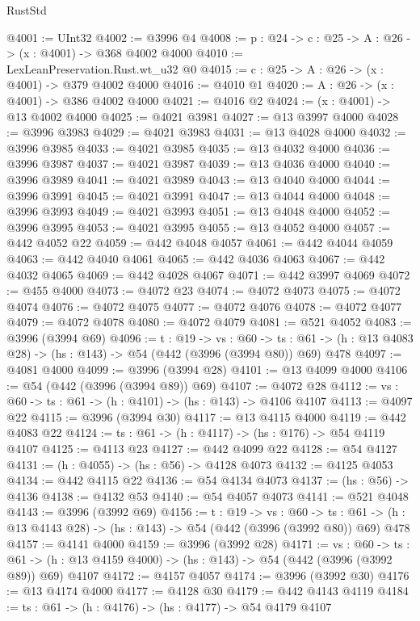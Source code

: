 \begin{lexlean}{RustStd}
\begin{coremodule}
@4001 := UInt32
@4002 := @3996 @4
@4008 := {p : @24} -> {c : @25} -> {A : @26} -> (x : @4001) -> @368 @4002 @4000
@4010 := LexLeanPreservation.Rust.wt_u32 @0
@4015 := {c : @25} -> {A : @26} -> (x : @4001) -> @379 @4002 @4000
@4016 := @4010 @1
@4020 := {A : @26} -> (x : @4001) -> @386 @4002 @4000
@4021 := @4016 @2
@4024 := (x : @4001) -> @13 @4002 @4000
@4025 := @4021 @3981
@4027 := @13 @3997 @4000
@4028 := @3996 @3983
@4029 := @4021 @3983
@4031 := @13 @4028 @4000
@4032 := @3996 @3985
@4033 := @4021 @3985
@4035 := @13 @4032 @4000
@4036 := @3996 @3987
@4037 := @4021 @3987
@4039 := @13 @4036 @4000
@4040 := @3996 @3989
@4041 := @4021 @3989
@4043 := @13 @4040 @4000
@4044 := @3996 @3991
@4045 := @4021 @3991
@4047 := @13 @4044 @4000
@4048 := @3996 @3993
@4049 := @4021 @3993
@4051 := @13 @4048 @4000
@4052 := @3996 @3995
@4053 := @4021 @3995
@4055 := @13 @4052 @4000
@4057 := @442 @4052 @22
@4059 := @442 @4048 @4057
@4061 := @442 @4044 @4059
@4063 := @442 @4040 @4061
@4065 := @442 @4036 @4063
@4067 := @442 @4032 @4065
@4069 := @442 @4028 @4067
@4071 := @442 @3997 @4069
@4072 := @455 @4000
@4073 := @4072 @23
@4074 := @4072 @4073
@4075 := @4072 @4074
@4076 := @4072 @4075
@4077 := @4072 @4076
@4078 := @4072 @4077
@4079 := @4072 @4078
@4080 := @4072 @4079
@4081 := @521 @4052
@4083 := @3996 (@3994 @69)
@4096 := {t : @19} ->
  {vs : @60} ->
  {ts : @61} -> (h : @13 @4083 @28) -> (hs : @143) -> @54 (@442 (@3996 (@3994 @80)) @69) @478
@4097 := @4081 @4000
@4099 := @3996 (@3994 @28)
@4101 := @13 @4099 @4000
@4106 := @54 (@442 (@3996 (@3994 @89)) @69)
@4107 := @4072 @28
@4112 := {vs : @60} -> {ts : @61} -> (h : @4101) -> (hs : @143) -> @4106 @4107
@4113 := @4097 @22
@4115 := @3996 (@3994 @30)
@4117 := @13 @4115 @4000
@4119 := @442 @4083 @22
@4124 := {ts : @61} -> (h : @4117) -> (hs : @176) -> @54 @4119 @4107
@4125 := @4113 @23
@4127 := @442 @4099 @22
@4128 := @54 @4127
@4131 := (h : @4055) -> (hs : @56) -> @4128 @4073
@4132 := @4125 @4053
@4134 := @442 @4115 @22
@4136 := @54 @4134 @4073
@4137 := (hs : @56) -> @4136
@4138 := @4132 @53
@4140 := @54 @4057 @4073
@4141 := @521 @4048
@4143 := @3996 (@3992 @69)
@4156 := {t : @19} ->
  {vs : @60} ->
  {ts : @61} -> (h : @13 @4143 @28) -> (hs : @143) -> @54 (@442 (@3996 (@3992 @80)) @69) @478
@4157 := @4141 @4000
@4159 := @3996 (@3992 @28)
@4171 := {vs : @60} ->
  {ts : @61} -> (h : @13 @4159 @4000) -> (hs : @143) -> @54 (@442 (@3996 (@3992 @89)) @69) @4107
@4172 := @4157 @4057
@4174 := @3996 (@3992 @30)
@4176 := @13 @4174 @4000
@4177 := @4128 @30
@4179 := @442 @4143 @4119
@4184 := {ts : @61} -> (h : @4176) -> (hs : @4177) -> @54 @4179 @4107

\end{coremodule}
\end{lexlean}

